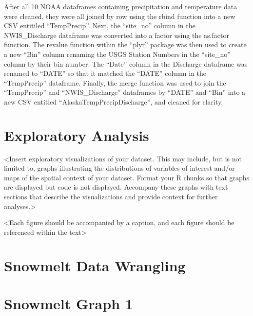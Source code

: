 \documentclass[12pt,]{article}
\begin{document}
After all 10 NOAA dataframes containing precipitation and temperature
data were cleaned, they were all joined by row using the rbind function
into a new CSV entitiled ``TempPrecip''. Next, the ``site\_no'' column
in the NWIS\_Discharge dataframe was converted into a factor using the
as.factor function. The revalue function within the ``plyr'' package was
then used to create a new ``Bin'' column renaming the USGS Station
Numbers in the ``site\_no'' column by their bin number. The ``Date''
column in the Discharge dataframe was renamed to ``DATE'' so that it
matched the ``DATE'' column in the ``TempPrecip'' dataframe. Finally,
the merge function was used to join the ``TempPrecip'' and
``NWIS\_Discharge'' dataframes by ``DATE'' and ``Bin'' into a new CSV
entitled ``AlaskaTempPrecipDischarge'', and cleaned for clarity.

\hypertarget{exploratory-analysis}{%
\section{Exploratory Analysis}\label{exploratory-analysis}}

\textless{}Insert exploratory visualizations of your dataset. This may
include, but is not limited to, graphs illustrating the distributions of
variables of interest and/or maps of the spatial context of your
dataset. Format your R chunks so that graphs are displayed but code is
not displayed. Accompany these graphs with text sections that describe
the visualizations and provide context for further
analyses.\textgreater{}

\textless{}Each figure should be accompanied by a caption, and each
figure should be referenced within the text\textgreater{}

\hypertarget{snowmelt-data-wrangling}{%
\section{Snowmelt Data Wrangling}\label{snowmelt-data-wrangling}}

\hypertarget{snowmelt-graph-1}{%
\section{Snowmelt Graph 1}\label{snowmelt-graph-1}}
\end{document}
